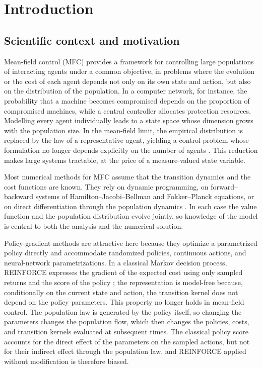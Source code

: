 \chapter{Introduction}
\label{chapter:introduction}

\section{Scientific context and motivation}

Mean-field control (MFC) provides a framework for controlling large populations of interacting agents under a common objective, in problems where the evolution or the cost of each agent depends not only on its own state and action, but also on the distribution of the population. In a computer network, for instance, the probability that a machine becomes compromised depends on the proportion of compromised machines, while a central controller allocates protection resources. Modelling every agent individually leads to a state space whose dimension grows with the population size. In the mean-field limit, the empirical distribution is replaced by the law of a representative agent, yielding a control problem whose formulation no longer depends explicitly on the number of agents \cite{motte2022mean}. This reduction makes large systems tractable, at the price of a measure-valued state variable.

Most numerical methods for MFC assume that the transition dynamics and the cost functions are known. They rely on dynamic programming, on forward--backward systems of Hamilton--Jacobi--Bellman and Fokker--Planck equations, or on direct differentiation through the population dynamics \cite{pham2018bellman, carmona2018probabilistic, lauriere2021numerical}. In each case the value function and the population distribution evolve jointly, so knowledge of the model is central to both the analysis and the numerical solution.

Policy-gradient methods are attractive here because they optimize a parametrized policy directly and accommodate randomized policies, continuous actions, and neural-network parametrizations. In a classical Markov decision process, REINFORCE expresses the gradient of the expected cost using only sampled returns and the score of the policy \cite{williams1992reinforce}; the representation is model-free because, conditionally on the current state and action, the transition kernel does not depend on the policy parameters. This property no longer holds in mean-field control. The population law is generated by the policy itself, so changing the parameters changes the population flow, which then changes the policies, costs, and transition kernels evaluated at subsequent times. The classical policy score accounts for the direct effect of the parameters on the sampled actions, but not for their indirect effect through the population law, and REINFORCE applied without modification is therefore biased.

